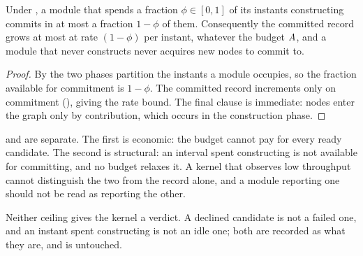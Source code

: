 \begin{proposition}
\label{prop:alternation}
Under , a module that spends a fraction $\phi\in[0,1]$ of its
instants constructing commits in at most a fraction $1-\phi$ of them.
Consequently the committed record grows at most at rate $(1-\phi)$ per
instant, whatever the budget $A$, and a module that never constructs
never acquires new nodes to commit to.
\end{proposition}

\begin{proof}
By  the two phases partition the instants a module occupies,
so the fraction available for commitment is $1-\phi$. The committed record
increments only on commitment (), giving the rate bound.
The final clause is immediate: nodes enter the graph only by contribution,
which occurs in the construction phase.
\end{proof}

\begin{remark}
\label{rem:two-ceilings}
 and  are separate. The first is
economic: the budget cannot pay for every ready candidate. The second is
structural: an interval spent constructing is not available for committing,
and no budget relaxes it. A kernel that observes low throughput cannot
distinguish the two from the record alone, and a module reporting one should
not be read as reporting the other.

Neither ceiling gives the kernel a verdict. A declined candidate is not a
failed one, and an instant spent constructing is not an idle one; both are
recorded as what they are, and  is untouched.
\end{remark}
